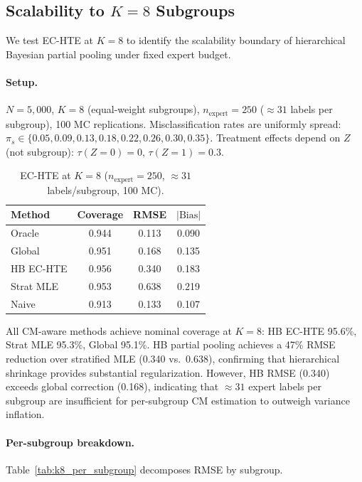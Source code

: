 \subsection{Scalability to $K{=}8$ Subgroups}
\label{app:k8_subgroups}

We test EC-HTE at $K{=}8$ to identify the scalability boundary of hierarchical Bayesian partial pooling under fixed expert budget.

\paragraph{Setup.}
$N{=}5{,}000$, $K{=}8$ (equal-weight subgroups), $n_{\text{expert}}{=}250$ (${\approx}31$ labels per subgroup), 100 MC replications.
Misclassification rates are uniformly spread: $\pi_s \in \{0.05, 0.09, 0.13, 0.18, 0.22, 0.26, 0.30, 0.35\}$.
Treatment effects depend on $Z$ (not subgroup): $\tau(Z{=}0){=}0$, $\tau(Z{=}1){=}0.3$.

\begin{table}[h]
\centering
\caption{EC-HTE at $K{=}8$ ($n_{\text{expert}}{=}250$, ${\approx}31$ labels/subgroup, 100 MC).}
\label{tab:k8_subgroups}
\small
\begin{tabular}{lccc}
\toprule
Method & Coverage & RMSE & $|\text{Bias}|$ \\
\midrule
Oracle       & 0.944 & 0.113 & 0.090 \\
Global       & 0.951 & 0.168 & 0.135 \\
HB EC-HTE    & 0.956 & 0.340 & 0.183 \\
Strat MLE    & 0.953 & 0.638 & 0.219 \\
Naive        & 0.913 & 0.133 & 0.107 \\
\bottomrule
\end{tabular}
\end{table}

All CM-aware methods achieve nominal coverage at $K{=}8$: HB EC-HTE 95.6\%, Strat MLE 95.3\%, Global 95.1\%.
HB partial pooling achieves a 47\% RMSE reduction over stratified MLE (0.340 vs.\ 0.638), confirming that hierarchical shrinkage provides substantial regularization.
However, HB RMSE (0.340) exceeds global correction (0.168), indicating that ${\approx}31$ expert labels per subgroup are insufficient for per-subgroup CM estimation to outweigh variance inflation.

\paragraph{Per-subgroup breakdown.}
Table~\ref{tab:k8_per_subgroup} decomposes RMSE by subgroup.

